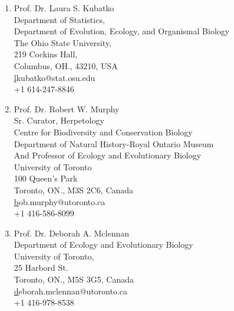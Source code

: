 \documentclass[11pt]{article}
\begin{document}
\begin{enumerate}

\item Prof. Dr. Laura S. Kubatko\\Department of Statistics,\\Department of Evolution, Ecology, and Organismal Biology\\The Ohio State University,\\219 Cockins Hall,\\Columbus, OH., 43210, USA\\\href{lkubatko@stat.osu.edu}lkubatko@stat.osu.edu\\+1 614-247-8846\\

\item Prof. Dr. Robert W. Murphy\\Sr. Curator, Herpetology\\Centre for Biodiversity and Conservation Biology\\Department of Natural History-Royal Ontario Museum\\And Professor of Ecology and Evolutionary Biology\\ University of Toronto\\100 Queen’s Park\\Toronto, ON., M3S 2C6, Canada\\\href{bob.murphy@utoronto.ca}bob.murphy@utoronto.ca\\+1 416-586-8099

\item Prof. Dr. Deborah A. Mclennan\\Department of Ecology and Evolutionary Biology\\University of Toronto,\\25 Harbord St.\\Toronto, ON., M5S 3G5, Canada \\\href{deborah.mclennan@utoronto.ca}deborah.mclennan@utoronto.ca\\+1 416-978-8538
\end{enumerate}









\end{document}
